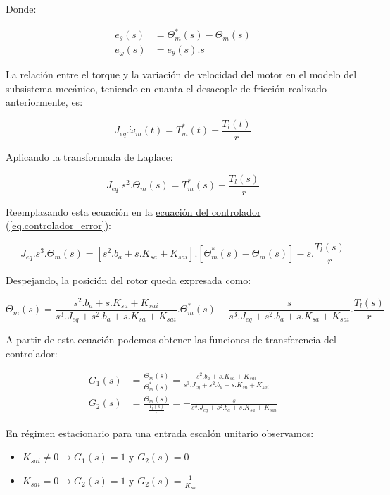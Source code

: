 \documentclass{article}
\begin{document}
Donde:

\begin{align}
    e_\theta(s) &= \Theta_m^*(s) - \Theta_m(s) \\
    e_\omega(s) &= e_\theta(s).s
\end{align}

La relación entre el torque y la variación de velocidad del motor en el modelo del subsistema mecánico, 
teniendo en cuanta el desacople de fricción realizado anteriormente, es:

\begin{equation}
    J_{eq}.\dot{\omega}_m(t) = T_m^*(t) - \frac{T_l(t)}{r}
\end{equation}

Aplicando la transformada de Laplace:

\begin{equation}
    J_{eq}.s^2.\Theta_m(s) = T_m^*(s) - \frac{T_l(s)}{r}
\end{equation}

Reemplazando esta ecuación en la
\hyperref[eq.controlador_error]{ecuación del controlador (\ref*{eq.controlador_error})}:

\begin{equation}
    J_{eq}.s^3.\Theta_m(s) = [s^2.b_a + s.K_{sa} + K_{sai}].[\Theta_m^*(s) - \Theta_m(s)] - s.\frac{T_l(s)}{r}
\end{equation}

Despejando, la posición del rotor queda expresada como:

\begin{equation}
    \Theta_m(s) = \frac{s^2.b_a + s.K_{sa} + K_{sai}}{s^3.J_{eq} + s^2.b_a + s.K_{sa} + K_{sai}}.\Theta_m^*(s) - \frac{s}{s^3.J_{eq} + s^2.b_a + s.K_{sa} + K_{sai}}.\frac{T_l(s)}{r}
\end{equation}

A partir de esta ecuación podemos obtener las funciones de transferencia del controlador:

\begin{align}
    G_1(s) &= \frac{\Theta_m(s)}{\Theta_m^*(s)} = \frac{s^2.b_a + s.K_{sa} + K_{sai}}{s^3.J_{eq} + s^2.b_a + s.K_{sa} + K_{sai}} \\
    G_2(s) &= \frac{\Theta_m(s)}{\frac{T_l(s)}{r}} = -\frac{s}{s^3.J_{eq} + s^2.b_a + s.K_{sa} + K_{sai}}
\end{align}

En régimen estacionario para una entrada escalón unitario observamos:

\begin{itemize}
    \item $K_{sai} \neq 0 \to G_1(s) = 1 $ y $G_2(s) = 0$
    \item $K_{sai} = 0 \to G_2(s) = 1 $ y $G_2(s) = \frac{1}{K_{sa}} $
\end{itemize}
\end{document}
